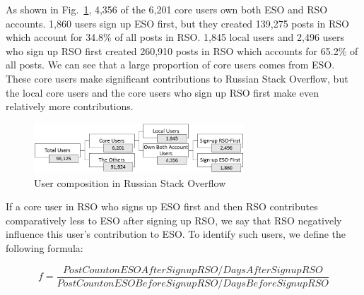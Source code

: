 As shown in Fig.~\ref{fig:usercomponent}, 4,356 of the 6,201 core users own both ESO and RSO accounts. 
1,860 users sign up ESO first, but they created 139,275 posts in RSO which account for 34.8\% of all posts in RSO.
1,845 local users and 2,496 users who sign up RSO first created 260,910 posts in RSO which accounts for 65.2\% of all posts.
We can see that a large proportion of core users comes from ESO.
These core users make significant contributions to Russian Stack Overflow, but the local core users and the core users who sign up RSO first make even relatively more contributions. 

\begin{figure}
	\centering
	\includegraphics[width = 0.7\textwidth]{figures/usercomponent.png}
	\caption{User composition in Russian Stack Overflow}
	\centering
	\label{fig:usercomponent}
\end{figure}

If a core user in RSO who signs up ESO first and then RSO contributes comparatively less to ESO after signing up RSO, we say that RSO negatively influence this user's contribution to ESO.
To identify such users, we define the following formula: 

\begin{equation}
f = \frac{PostCountonESOAfterSignupRSO/DaysAfterSignupRSO}{PostCountonESOBeforeSignupRSO/DaysBeforeSignupRSO}	 
\label{equ:active}
\end{equation}

